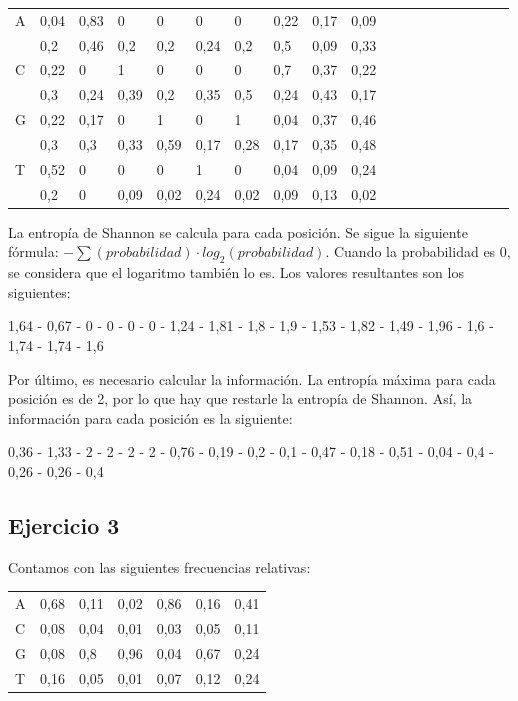 \begin{table}[h]
\begin{tabular}{l | llllllllllllllllll}
A & 0,04 & 0,83 & 0 & 0 & 0 & 0 & 0,22 & 0,17 & 0,09 \\
& 0,2 & 0,46 & 0,2  & 0,2  & 0,24 & 0,2  & 0,5  & 0,09 & 0,33 \\
C & 0,22  & 0    & 1 & 0 & 0 & 0 & 0,7  & 0,37 & 0,22 \\
& 0,3 & 0,24 & 0,39 & 0,2  & 0,35 & 0,5  & 0,24 & 0,43 & 0,17 \\
G & 0,22  & 0,17 & 0 & 1 & 0 & 1 & 0,04 & 0,37 & 0,46 \\
& 0,3 & 0,3  & 0,33 & 0,59 & 0,17 & 0,28 & 0,17 & 0,35 & 0,48 \\
T & 0,52 & 0    & 0 & 0 & 1 & 0 & 0,04 & 0,09 & 0,24 \\
& 0,2 & 0    & 0,09 & 0,02 & 0,24 & 0,02 & 0,09 & 0,13 & 0,02
\end{tabular}
\end{table}

La entropía de Shannon se calcula para cada posición. Se sigue la siguiente fórmula: $- \sum (probabilidad) \cdot log_2 (probabilidad) $. Cuando la probabilidad es 0, se considera que el logaritmo también lo es. Los valores resultantes son los siguientes:

1,64 - 0,67 - 0 - 0 - 0 - 0 - 1,24 - 1,81 - 1,8 - 1,9 - 1,53 - 1,82 - 1,49 - 1,96 - 1,6 - 1,74 - 1,74 - 1,6


Por último, es necesario calcular la información. La entropía máxima para cada posición es de 2, por lo que hay que restarle la entropía de Shannon. Así, la información para cada posición es la siguiente: 

0,36 - 1,33 - 2 - 2 - 2 - 2 - 0,76 - 0,19 - 0,2 - 0,1 - 0,47 - 0,18 - 0,51 - 0,04 - 0,4 - 0,26 - 0,26 - 0,4


\subsection{Ejercicio 3}
Contamos con las siguientes frecuencias relativas:
\begin{table}[h]
\centering
\begin{tabular}{l | llllll}
A & 0,68 & 0,11 & 0,02 & 0,86 & 0,16 & 0,41 \\
C & 0,08 & 0,04 & 0,01 & 0,03 & 0,05 & 0,11 \\
G & 0,08 & 0,8  & 0,96 & 0,04 & 0,67 & 0,24 \\
T & 0,16 & 0,05 & 0,01 & 0,07 & 0,12 & 0,24
\end{tabular}
\end{table}

